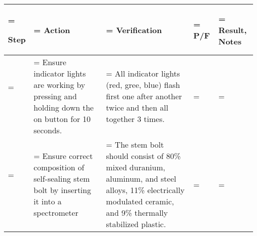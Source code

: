 \documentclass[a4paper,12pt]{article}
\newcounter{teststepctr}
\def\arraystretch{1.5}%
\begin{document}
\small
\def\arraystretch{1.5}%
\begin{xltabular}{\textwidth}{
	|>{\hsize\linewidth=\hsize}X
	|>{\hsize\linewidth=\hsize}X
	|>{\hsize\linewidth=\hsize}X
	|>{\hsize\linewidth=\hsize}X
	|>{\hsize\linewidth=\hsize}X
	|
	}
	\hline


	Step  &
	Action  &
	Verification  &
	P/F  &
	Result, Notes   \\ \hline \endhead
	\addtocounter{teststepctr}{1} \theteststepctr \ &
	Ensure indicator lights are working by pressing and holding down the on button for 10 seconds.&
	All indicator lights (red, gree, blue) flash first one after another twice and then all together 3 times.
	&

	&

	\\ \hline

	\addtocounter{teststepctr}{1} \theteststepctr \ &
	Ensure correct composition of self-sealing stem bolt by inserting it into a spectrometer &
	The stem bolt should consist of 80\% mixed duranium, aluminum, and steel alloys, 11\% electrically modulated ceramic, and 9\% thermally stabilized plastic.
	&

	&

	\\ \hline



\end{xltabular}
\egroup
\end{document}
